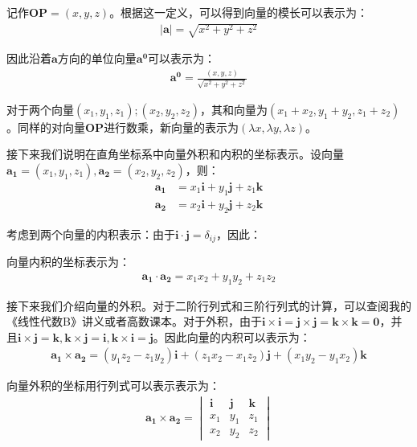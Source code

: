 \documentclass{ctexart}
\begin{document}
记作$\bm{OP}=(x,y,z)$。根据这一定义，可以得到向量的模长可以表示为：
\begin{align*}
    |\bm{a}|=\sqrt{x^2+y^2+z^2}
\end{align*}

因此沿着$\bm{a}$方向的单位向量$\bm{a^0}$可以表示为：
\begin{align*}
    \bm{a^0}=\frac{(x,y,z)}{\sqrt{x^2+y^2+z^2}}
\end{align*}

对于两个向量$(x_1,y_1,z_1);(x_2,y_2,z_2)$，其和向量为$(x_1+x_2,y_1+y_2,z_1+z_2)$。同样的对向量$\bm{OP}$进行数乘，新向量的表示为$(\lambda x,\lambda y,\lambda z)$。

接下来我们说明在直角坐标系中向量外积和内积的坐标表示。设向量$\bm{a_1}=(x_1,y_1,z_1),\bm{a_2}=(x_2,y_2,z_2)$，则：
\begin{align*}
    \bm{a_1}&=x_1\bm{i}+y_1\bm{j}+z_1\bm{k}\\
    \bm{a_2}&=x_2\bm{i}+y_2\bm{j}+z_2\bm{k}
\end{align*}

考虑到两个向量的内积表示：由于$\bm{i}\cdot\bm{j}=\delta_{ij}$，因此：
\begin{tcolorbox}[
    colback=bac1,     %
    colframe=fra1,   %
    coltitle=white,             %
    coltext=tex1,
    title=内积的坐标表示,
    fonttitle=\bfseries,        %
arc=3mm,                     %
breakable
]
向量内积的坐标表示为：
\begin{align*}
    \bm{a_1}\cdot\bm{a_2}=x_1x_2+y_1y_2+z_1z_2\tag{6-5}
\end{align*}
\end{tcolorbox}

接下来我们介绍向量的外积。对于二阶行列式和三阶行列式的计算，可以查阅我的《线性代数B》讲义或者高数课本。对于外积，由于$\bm{i}\times\bm{i}=\bm{j}\times\bm{j}=\bm{k}\times\bm{k}=\bm{0}$，并且$\bm{i}\times\bm{j}=\bm{k},\bm{k}\times\bm{j}=\bm{i},\bm{k}\times\bm{i}=\bm{j}$。因此向量的内积可以表示为：
\begin{align*}
    \bm{a_1}\times\bm{a_2}=(y_1z_2-z_1y_2)\bm{i}+(z_1x_2-x_1z_2)\bm{j}+(x_1y_2-y_1x_2)\bm{k}
\end{align*}

\begin{tcolorbox}[
    colback=bac1,     %
    colframe=fra1,   %
    coltitle=white,             %
    coltext=tex1,
    title=外积的坐标表示,
    fonttitle=\bfseries,        %
arc=3mm,                     %
breakable
]
向量外积的坐标用行列式可以表示表示为：
\begin{align*}
    \bm{a_1}\times\bm{a_2}=\begin{vmatrix}
\bm{i}  & \bm{j} & \bm{k} \\
 x_1 & y_1 & z_1\\
 x_2 &y_2  & z_2
\end{vmatrix}\tag{6-6}
\end{align*}
\end{tcolorbox}
\end{document}
